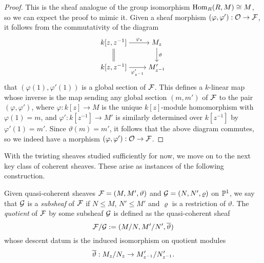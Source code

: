 \begin{proof}
  This is the sheaf analogue of the group isomorphism $\operatorname{Hom}_R(R, M)
  \cong M$, so we can expect the proof to mimic it.
  Given a sheaf morphism $(\varphi, \varphi'): \mathcal{O} \to \mathcal{F}$,
  it follows from the commutativity of the diagram
  \[
    \begin{tikzcd}[cramped]
      {k[z, z^{-1}]} & {M_z} \\
      {k[z, z^{-1}]} & {M'_{z^{-1}}}
      \arrow["\varphi_z", from=1-1, to=1-2]
      \arrow[Rightarrow, no head, from=1-1, to=2-1]
      \arrow["\vartheta", from=1-2, to=2-2]
      \arrow["{\varphi'_{z^{-1}}}"', from=2-1, to=2-2]
    \end{tikzcd}
  \]
  that $(\varphi(1), \varphi'(1))$ is a global section of $\mathcal{F}$.
  This defines a $k$-linear map whose inverse is the map sending any
  global section $(m, m')$ of $\mathcal{F}$ to the pair $(\varphi,
  \varphi')$, where $\varphi: k[z] \to M$ is the unique $k[z]$-module
  homomorphism with $\varphi(1) = m$, and $\varphi': k[z^{-1}] \to
  M'$ is similarly determined over $k[z^{-1}]$ by $\varphi'(1) = m'$.
  Since $\vartheta(m) = m'$, it follows that the above diagram
  commutes, so we indeed have a morphism $(\varphi, \varphi'):
  \mathcal{O} \to \mathcal{F}$.
\end{proof}

With the twisting sheaves studied sufficiently for now, we move on to
the next key class of coherent sheaves.
These arise as instances of the following construction.

\begin{definition}
  \label{def_qcoh_sub_and_quot_objs}
  Given quasi-coherent sheaves $\mathcal{F} = (M, M', \vartheta)$ and
  $\mathcal{G} = (N, N', \varrho)$ on $\mathbb{P}^{{1}}$, we say that $\mathcal{G}$
  is a \emph{subsheaf} of $\mathcal{F}$ if $N \leq M$, $N' \leq M'$ and
  $\varrho$ is a restriction of $\vartheta$.
  The \emph{quotient} of $\mathcal{F}$ by some subsheaf $\mathcal{G}$ is
  defined as the quasi-coherent sheaf
  \[
    {\mathcal{F}}\mathopen/{\mathcal{G}} := ({M}\mathopen/{N}, {M'}\mathopen/{N'},
    \overline{\vartheta})
  \]
  whose descent datum is the induced isomorphism on quotient modules
  \[
    \overline{\vartheta}: {M_z}\mathopen/{N_z} \to {M'_{z^{-1}}}\mathopen/{N'_{z^{-1}}}.
  \]
  \vspace{-24pt}
\end{definition}


